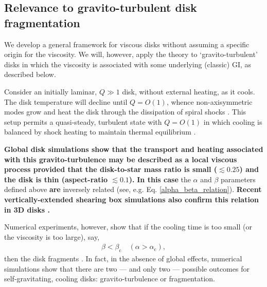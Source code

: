 \documentclass[iop, numberedappendix]{emulateapj}
\begin{document}

\subsection{Relevance to gravito-turbulent disk fragmentation}\label{frag_intro}
We develop a general framework for viscous disks without  
assuming a specific origin for the viscosity. 
We will, however, apply the theory to `gravito-turbulent'
disks in which the viscosity is associated with some underlying
(classic) GI, as described below.  

Consider an initially laminar, $Q\gg1$ disk, without external 
heating, as it cools. The disk temperature will decline
until $Q=O(1)$, whence non-axisymmetric modes grow and heat the disk
through the dissipation of spiral shocks \citep{cossins09}. 
This setup permits a quasi-steady, turbulent state with
$Q =O(1)$ in which cooling is balanced by shock heating to maintain
thermal equilibrium {\bf \citep{gammie01,shi14}}. 

{\bf 
  Global disk simulations \citep[e.g.][]{lodato04} show
  that the transport and 
  heating associated with this gravito-turbulence may be described as a
  local viscous process provided that the disk-to-star mass ratio is
  small ($\lesssim0.25$) and the disk is thin (aspect-ratio $\lesssim
  0.1$).  
}
{\bf In this case} the $\alpha$ and $\beta$ parameters defined above
{\bf are} inversely related (see, 
e.g. Eq. \ref{alpha_beta_relation}). {\bf Recent 
  vertically-extended shearing box simulations 
  also confirm this relation in 3D disks \citep{shi14}.} 
   
Numerical experiments, however, show that if the cooling time is too
small (or the viscosity is too large), say,   
\begin{align}\label{frag_cond}
  \beta < \beta_\mathrm{c} \quad
  \left(\alpha>\alpha_\mathrm{c}\right), 
\end{align}
then the disk fragments \citep{gammie01,rice05,rice11}. In fact, in 
the absence of global effects, numerical simulations show that there are
two --- and only two --- possible outcomes for self-gravitating,
cooling disks: gravito-turbulence or fragmentation. 
\end{document}
